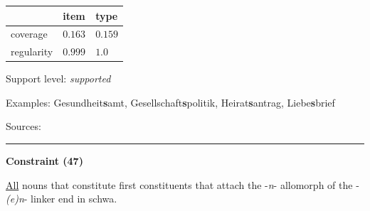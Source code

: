 \vspace{-0.35em}

\begin{table}[!ht]
\begin{center}

\begin{tabularx}{\columnwidth}{|X|X|X|}
\hline
 & item & type \\
\hline
 coverage & $0.163$ & $0.159$ \\
\hline
 regularity & $0.999$ & $1.0$ \\
\hline
\end{tabularx}
\end{center}
\end{table}

\vspace{-1.35em}

\noindent
Support level: \textit{supported}

\vspace{0.3em}

\noindent
Examples: Gesundheit\textbf{s}amt, Gesellschaft\textbf{s}politik, Heirat\textbf{s}antrag, Liebe\textbf{s}brief

\vspace{0.3em}

\noindent
Sources: \citet[73]{ortner_mueller-bollhagen_1991}


\hrule




\vspace{0.4em}

\begin{center}
\textbf{Constraint (47)}
\end{center}

\noindent
\underline{All} nouns that constitute first constituents that attach the -\textit{n}- allomorph of the -\textit{(e)n}- linker end in schwa.
\vspace{0.35em}


\vspace{-0.35em}

